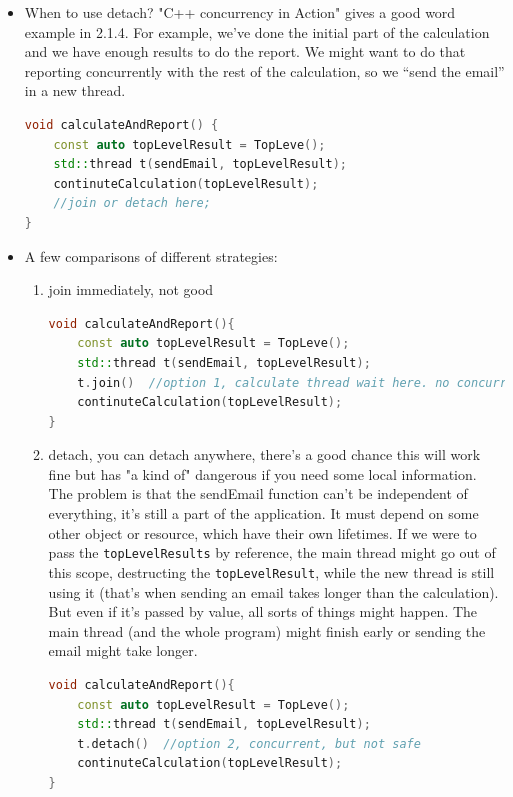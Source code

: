 \documentclass[a4paper,11pt,twoside]{book}
\begin{document}
\begin{itemize}

	\item When to use detach? "C++ concurrency in Action" gives a good word example in 2.1.4. For example, we’ve done the initial part of the calculation and we have enough results to do the report. We might want to do that reporting concurrently with the rest of the calculation, so we “send the email” in a new thread.

\begin{lstlisting}[frame=single, language=c++]
void calculateAndReport() {
	const auto topLevelResult = TopLeve();
	std::thread t(sendEmail, topLevelResult);
	continuteCalculation(topLevelResult);
	//join or detach here;
}
\end{lstlisting}	


	\item  A few comparisons of different strategies:
	\begin{enumerate}
		\item join immediately, not good
\begin{lstlisting}[frame=single, language=c++]
void calculateAndReport(){
	const auto topLevelResult = TopLeve();
	std::thread t(sendEmail, topLevelResult);
	t.join()  //option 1, calculate thread wait here. no concurrent at all. 
	continuteCalculation(topLevelResult);
}		
\end{lstlisting}	

		\item detach, you can detach anywhere, there’s a good chance this will work fine but has "a kind of" dangerous if you need some local information. The problem is that the sendEmail function can’t be independent of everything, it’s still a part of the application. It must depend on some other object or resource, which have their own lifetimes. If we were to pass the \texttt{topLevelResults} by reference, the main thread might go out of this scope, destructing the \texttt{topLevelResult}, while the new thread is still using it (that’s when sending an email takes longer than the calculation). But even if it’s passed by value, all sorts of things might happen. The main thread (and the whole program) might finish early or sending the email might take longer.
\begin{lstlisting}[frame=single, language=c++]
void calculateAndReport(){
	const auto topLevelResult = TopLeve();
	std::thread t(sendEmail, topLevelResult);
	t.detach()  //option 2, concurrent, but not safe 
	continuteCalculation(topLevelResult);
}			
\end{lstlisting}


\end{enumerate}
\end{itemize}
\end{document}
